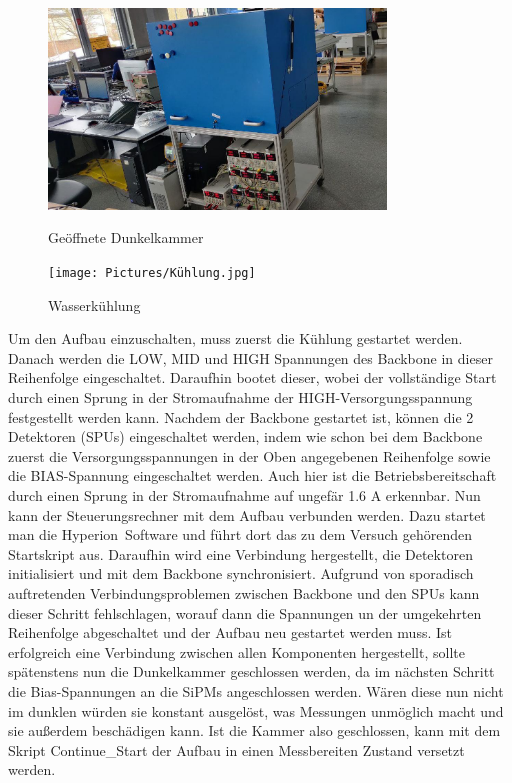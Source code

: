 \documentclass[12pt,twoside,a4paper]{scrartcl}
\begin{document}
	\begin{figure}[H]
		\begin{minipage}{0.69\textwidth}

					\includegraphics[width = 0.8\textwidth]{Pictures/Kammer.jpg}
					\label{Aufbau::Kammer}
					\caption{Geöffnete Dunkelkammer}

		\end{minipage}
		\begin{minipage}{0.3\textwidth}

					\texttt{[image: Pictures/Kühlung.jpg]}
					\label{Aufbau::Kühlung}
					\caption{Wasserkühlung}
		\end{minipage}
	\end{figure}


	Um den Aufbau einzuschalten, muss zuerst die Kühlung gestartet werden. Danach werden die LOW, MID und HIGH Spannungen des Backbone in dieser Reihenfolge eingeschaltet. Daraufhin bootet dieser, wobei der vollständige Start durch einen Sprung in der Stromaufnahme der HIGH-Versorgungsspannung festgestellt werden kann. Nachdem der Backbone gestartet ist, können die 2 Detektoren (SPUs) eingeschaltet werden, indem wie schon bei dem Backbone zuerst die Versorgungsspannungen in der Oben angegebenen Reihenfolge sowie die BIAS-Spannung eingeschaltet werden. Auch hier ist die Betriebsbereitschaft durch einen Sprung in der Stromaufnahme auf ungefär 1.6 A erkennbar. Nun kann der Steuerungsrechner mit dem Aufbau verbunden werden. Dazu startet man die \glqq Hyperion\grqq \ Software und führt dort das zu dem Versuch gehörenden Startskript aus. Daraufhin wird eine Verbindung hergestellt, die Detektoren initialisiert und mit dem Backbone synchronisiert. Aufgrund von sporadisch auftretenden Verbindungsproblemen zwischen Backbone und den SPUs kann dieser Schritt fehlschlagen, worauf dann die Spannungen un der umgekehrten Reihenfolge abgeschaltet und der Aufbau neu gestartet werden muss.
	Ist erfolgreich eine Verbindung zwischen allen Komponenten hergestellt, sollte spätenstens nun die Dunkelkammer geschlossen werden, da im nächsten Schritt die Bias-Spannungen an die SiPMs angeschlossen werden. Wären diese nun nicht im dunklen würden sie konstant ausgelöst, was Messungen unmöglich macht und sie außerdem beschädigen kann. Ist die Kammer also geschlossen, kann mit dem Skript \glqq Continue\_Start \grqq der Aufbau in einen Messbereiten Zustand versetzt werden.
\end{document}
